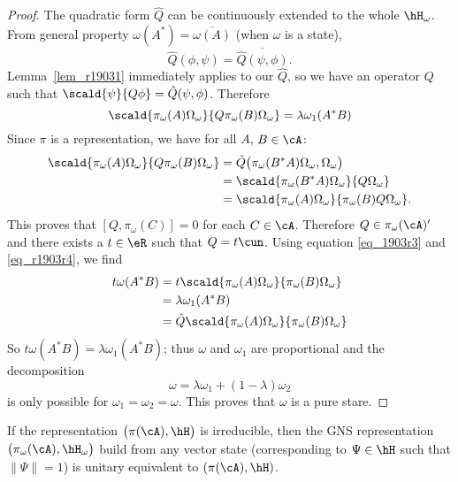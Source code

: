 \begin{proof}
The quadratic form $\hat Q$ can be continuously extended to the whole $\hH_{\omega}$. From general property $\omega(A^*)=\overline{ \omega(A) }$ (when $\omega$ is a state),
\[
  \hat Q(\phi,\psi)=\overline{ \hat Q(\psi,\phi) }.
\]
Lemma~\ref{lem_r19031} immediately applies to our $\hat Q$, so we have an operator $Q$ such that $\scald{ \psi }{ Q\phi }=\hat Q(\psi,\phi)$. Therefore
%
\begin{equation} \label{eq_1903r3}
  \scald{ \pi_{\omega}(A)\Omega_{\omega}}{Q\pi_{\omega}(B)\Omega_{\omega}}=\lambda\omega_1(A^*B)
\end{equation}
Since $\pi$ is a representation, we have for all $A$, $B\in\cA$:
 \begin{equation}
\begin{split}
  \scald{ \pi_{\omega}(A)\Omega_{\omega} }{ Q\pi_{\omega}(B)\Omega_{\omega} }
     &=\hat Q\big( \pi_{\omega}(B^*A)\Omega_{\omega},\Omega_{\omega} \big)\\
        &=\scald{ \pi_{\omega}(B^*A)\Omega_{\omega} }{ Q\Omega_{\omega} }\\
        &=\scald{ \pi_{\omega}(A)\Omega_{\omega} }{ \pi_{\omega}(B)Q\Omega_{\omega} }.
\end{split}
\end{equation}
This proves that $[Q,\pi_{\omega}(C)]=0$ for each $C\in\cA$. Therefore $Q\in\pi_{\omega}(\cA)'$ and there exists a $t\in\eR$ such that $Q=t\cun$. Using equation \eqref{eq_1903r3} and  \eqref{eq_r1903r4}, we find
%
\begin{equation}
\begin{split}
t\omega(A^*B)&=t\scald{ \pi_{\omega}(A)\Omega_{\omega} }{ \pi_{\omega}(B)\Omega_{\omega} }\\
&=\lambda\omega_1(A^*B)\\
&=\hat Q\scald{ \pi_{\omega}(A)\Omega_{\omega} }{ \pi_{\omega}(B)\Omega_{\omega} }\\
\end{split}
\end{equation}
So $t\omega(A^*B)=\lambda\omega_1(A^*B)$; thus $\omega$ and $\omega_1$ are proportional and the decomposition
%
\[
  \omega=\lambda\omega_1+(1-\lambda)\omega_2
\]
is only possible for $\omega_1=\omega_2=\omega$. This proves that $\omega$ is a pure stare.

\end{proof}


\begin{corollary}
If the representation $\big( \pi(\cA),\hH \big)$ is irreducible, then the GNS representation $\big( \pi_{\omega}(\cA),\hH_{\omega} \big)$ build from any vector state (corresponding to $\Psi\in\hH$ such that $\| \Psi \|=1$) is unitary equivalent to $(\pi(\cA),\hH)$.
 \label{cor_GNSirredst}
\end{corollary}

